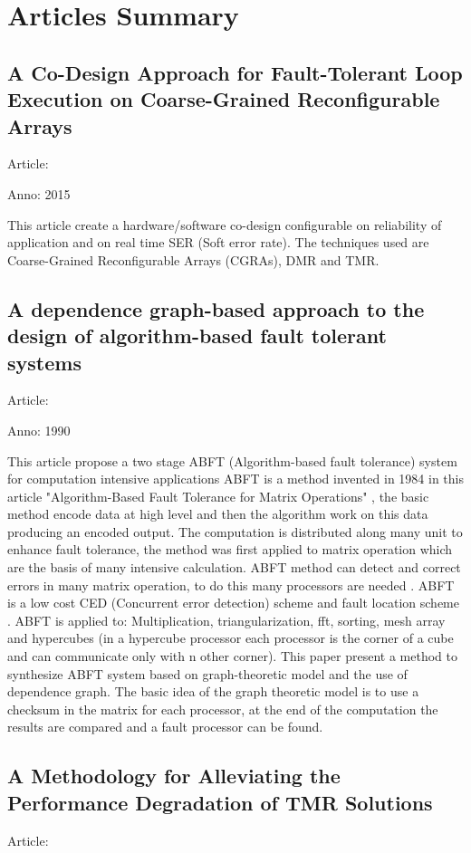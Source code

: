 \chapter{Articles Summary}{
	\label{chap:ArticleSummary}
	\section{A Co-Design Approach for Fault-Tolerant Loop Execution on Coarse-Grained Reconfigurable Arrays }{
		Article: \cite{FT_adaptive_loop_execution}
		
		Anno: 2015
		
		This article create a hardware/software co-design configurable on reliability of application and on real time SER (Soft error rate). The techniques used are Coarse-Grained Reconfigurable
		Arrays (CGRAs), DMR and TMR.
	}
	\section{A dependence graph-based approach to the design of algorithm-based fault tolerant systems}{
		Article: \cite{ABFT_method_graph_based}
		
		Anno: 1990		
		
		This article propose a two stage ABFT (Algorithm-based fault tolerance) system for computation intensive applications\cite{ABFT_method_graph_based} ABFT is a method invented in 1984 in this article "Algorithm-Based Fault Tolerance for Matrix Operations" \cite{ABFT_method}, the basic method encode data at high level and then the algorithm work on this data producing an encoded output. The computation is distributed along many unit to enhance fault tolerance, the method was first applied to matrix operation which are the basis of many intensive calculation. ABFT method can detect and correct errors in many matrix operation, to do this many processors are needed \cite{ABFT_method} . ABFT is a low cost CED (Concurrent error detection) scheme and fault location scheme \cite{ABFT_method_graph_based}.
		ABFT is applied to: Multiplication, triangularization, fft, sorting, mesh array and hypercubes (in a hypercube processor each processor is the corner of a cube and can communicate only with n other corner).
		This paper present a method to synthesize ABFT system based on graph-theoretic model and the use of dependence graph. The basic idea of the graph theoretic model is to use a checksum in the matrix for each processor, at the end of the computation the results are compared and a fault processor can be found. 
	}
	\section{A Methodology for Alleviating the Performance Degradation of TMR Solutions}{
		Article: \cite{Alleviate_TMR_preformance_degradation}
		
}}
